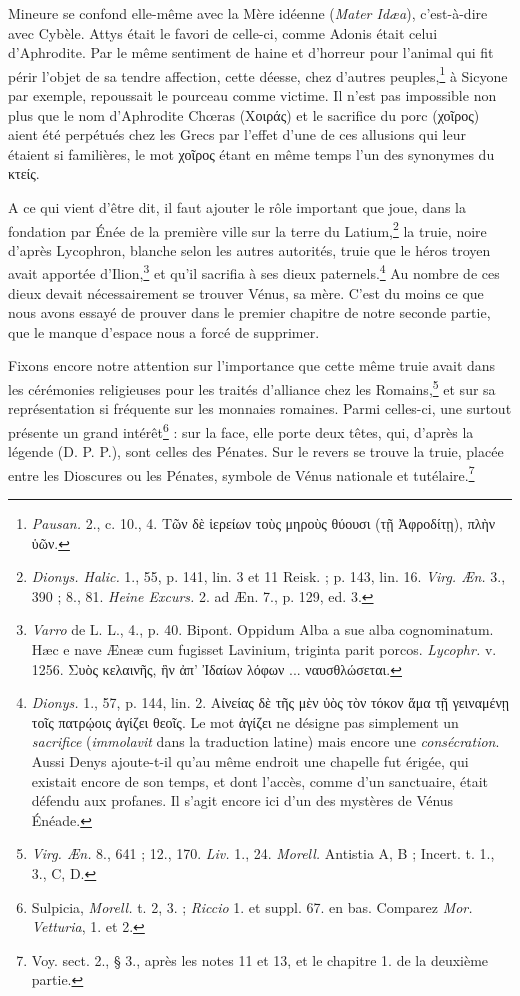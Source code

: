 \documentclass[a4paper, 11pt, oneside, polutonikogreek, french]{article}
\begin{document}
Mineure se confond elle-même avec la Mère idéenne (\emph{Mater Idæa}), c'est-à-dire avec Cybèle. Attys était le favori de celle-ci, comme Adonis était celui d'Aphrodite. Par le même sentiment de haine et d'horreur pour l'animal qui fit périr l'objet de sa tendre affection, cette déesse, chez d'autres peuples,\footnote{\emph{Pausan.} 2., c. 10., 4. Τῶν δὲ ἱερείων τοὺς μηροὺς θύουσι (τῇ Ἀφροδίτῃ), πλὴν ὑῶν.} à Sicyone par exemple, repoussait le pourceau comme victime. Il n'est pas impossible non plus que le nom d'Aphrodite Chœras (Χοιράς) et le sacrifice du porc (χοῖρος) aient été perpétués chez les Grecs par l'effet d'une de ces allusions qui leur étaient si familières, le mot χοῖρος étant en même temps l'un des synonymes du κτείς.

A ce qui vient d'être dit, il faut ajouter le rôle important que joue, dans la fondation par Énée de la première ville sur la terre du Latium,\footnote{\emph{Dionys. Halic.} 1., 55, p. 141, lin. 3 et 11 Reisk. ; p. 143, lin. 16. \emph{Virg. Æn.} 3., 390 ; 8., 81. \emph{Heine Excurs.} 2. ad Æn. 7., p. 129, ed. 3.} la truie, noire d'après Lycophron, blanche selon les autres autorités, truie que le héros troyen avait apportée d'Ilion,\footnote{\emph{Varro} de L. L., 4., p. 40. Bipont. Oppidum Alba a sue alba cognominatum. Hæc e nave Æneæ cum fugisset Lavinium, triginta parit porcos. \emph{Lycophr.} v. 1256. Συὸς κελαινῆς, ἣν ἀπ' Ἰδαίων λόφων ... ναυσθλώσεται.} et qu'il sacrifia à ses dieux paternels.\footnote{\emph{Dionys.} 1., 57, p. 144, lin. 2. Αἰνείας δὲ τῆς μὲν ὑὸς τὸν τόκον ἅμα τῇ γειναμένῃ τοῖς πατρῴοις ἁγίζει θεοῖς. Le mot ἁγίζει ne désigne pas simplement un \emph{sacrifice} (\emph{immolavit} dans la traduction latine) mais encore une \emph{consécration}. Aussi Denys ajoute-t-il qu'au même endroit une chapelle fut érigée, qui existait encore de son temps, et dont l'accès, comme d'un sanctuaire, était défendu aux profanes. Il s'agit encore ici d'un des mystères de Vénus Énéade.} Au nombre de ces dieux devait nécessairement se trouver Vénus, sa mère. C'est du moins ce que nous avons essayé de prouver dans le premier chapitre de notre seconde partie, que le manque d'espace nous a forcé de supprimer. 

Fixons encore notre attention sur l'importance que cette même truie avait dans les cérémonies religieuses pour les traités d'alliance chez les Romains,\footnote{\emph{Virg. Æn.} 8., 641 ; 12., 170. \emph{Liv.} 1., 24. \emph{Morell.} Antistia A, B ; Incert. t. 1., 3., C, D.} et sur sa représentation si fréquente sur les monnaies romaines. Parmi celles-ci, une surtout présente un grand intérêt\footnote{Sulpicia, \emph{Morell.} t. 2, 3. ; \emph{Riccio} 1. et suppl. 67. en bas. Comparez \emph{Mor. Vetturia}, 1. et 2.} : sur la face, elle porte deux têtes, qui, d'après la légende (D. P. P.), sont celles des Pénates. Sur le revers se trouve la truie, placée entre les Dioscures ou les Pénates, symbole de Vénus nationale et tutélaire.\footnote{Voy. sect. 2., § 3., après les notes 11 et 13, et le chapitre 1. de la deuxième partie.}
\end{document}
